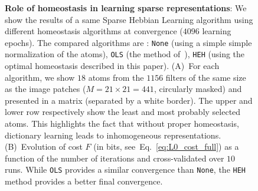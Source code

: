 \documentclass[vision,article,submit,oneauthor,pdftex]{Definitions/mdpi}
\newcommand{\seeEq}[1]{Eq.~\ref{eq:#1}}%
\begin{document}
\begin{figure}%
\caption{
{\bf Role of homeostasis in learning sparse representations}:
We show the results of a same Sparse Hebbian Learning algorithm using different homeostasis algorithms at convergence ($4096$ learning epochs). The compared algorithms are : \texttt{None} (using a simple simple normalization of the atoms), \texttt{OLS} (the method of~\citep{Olshausen97}), \texttt{HEH} (using the optimal homeostasis described in this paper). {\sf (A)}~For each algorithm, we show $18$ atoms from the $1156$ filters of the same size as the image patches ($M= 21 \times 21=441$, circularly masked) and presented in a matrix (separated by a white border). The upper and lower row respectively show the least and most probably selected atoms. This highlights the fact that without proper homeostasis, dictionary learning leads to inhomogeneous representations. {\sf (B)}~Evolution of cost  $F$ (in bits, see~\seeEq{L0_cost_full}) as a function of the number of iterations and cross-validated over $10$ runs. While \texttt{OLS} provides a similar convergence than \texttt{None}, the \texttt{HEH} method provides a better final convergence. %
\label{fig:map}}%
\end{figure}%
\end{document}
